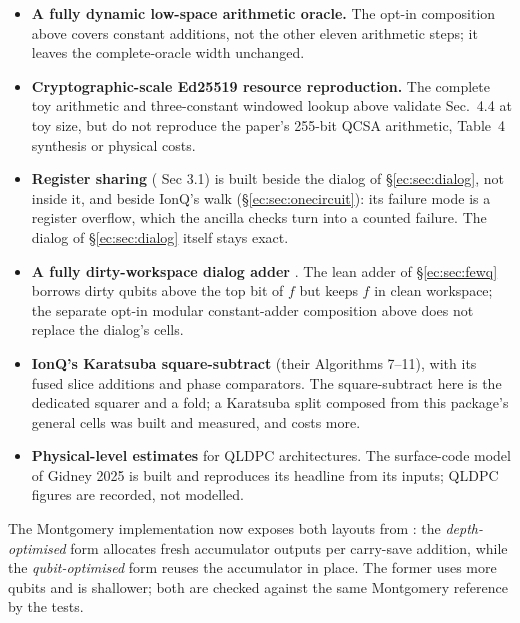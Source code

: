 \begin{itemize}\setlength\itemsep{2pt}
\item \textbf{A fully dynamic low-space arithmetic oracle.} The opt-in
composition above covers constant additions, not the other eleven
arithmetic steps; it leaves the complete-oracle width unchanged.
\item \textbf{Cryptographic-scale Ed25519 resource reproduction.}
The complete toy arithmetic and three-constant windowed lookup above validate
\cite{ec:kim26} Sec.~4.4 at toy size, but do not reproduce the paper's
255-bit QCSA arithmetic, Table~4 synthesis or physical costs.
\item \textbf{Register sharing} (\cite{ec:schrott26} Sec 3.1) is built beside the dialog of
\S\ref{ec:sec:dialog}, not inside it, and beside IonQ's walk (\S\ref{ec:sec:onecircuit}): its
failure mode is a register overflow, which the ancilla checks turn into a counted failure. The
dialog of \S\ref{ec:sec:dialog} itself stays exact.
\item \textbf{A fully dirty-workspace dialog adder} \cite{ec:gidney25}. The
lean adder of \S\ref{ec:sec:fewq} borrows dirty qubits above the top bit of
$f$ but keeps $f$ in clean workspace; the separate opt-in modular
constant-adder composition above does not replace the dialog's cells.
\item \textbf{IonQ's Karatsuba square-subtract} (their Algorithms 7--11), with its fused slice
additions and phase comparators. The square-subtract here is the dedicated squarer and a fold; a
Karatsuba split composed from this package's general cells was built and measured, and costs more.
\item \textbf{Physical-level estimates} for QLDPC architectures. The surface-code model of
Gidney 2025 is built and reproduces its headline from its inputs; QLDPC figures are recorded, not
modelled.
\end{itemize}

\noindent
The Montgomery implementation now exposes both layouts from \cite{ec:kim26}: the
\emph{depth-optimised} form allocates fresh accumulator outputs per carry-save addition, while the
\emph{qubit-optimised} form reuses the accumulator in place. The former uses more qubits and is
shallower; both are checked against the same Montgomery reference by the tests.

